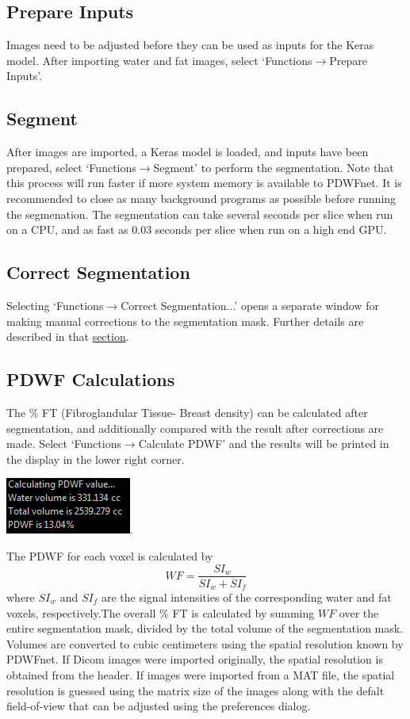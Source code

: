 \documentclass[twoside,a4paper]{refart}
\newcommand{\ra}{$\rightarrow$}
\begin{document}
\subsection{Prepare Inputs}

Images need to be adjusted before they can be used as inputs for the Keras model. After importing water and fat images, select `Functions\ra Prepare Inputs'.

\subsection{Segment}

After images are imported, a Keras model is loaded, and inputs have been prepared, select `Functions\ra Segment' to perform the segmentation. Note that this process will run faster if more system memory is available to PDWFnet. It is recommended to close as many background programs as possible before running the segmenation.
The segmentation can take several seconds per slice when run on a CPU, and as fast as 0.03 seconds per slice when run on a high end GPU.

\subsection{Correct Segmentation}

Selecting `Functions\ra Correct Segmentation...' opens a separate window for making manual corrections to the segmentation mask. Further details are described in that \hyperref[Corrections]{section}.

\subsection{PDWF Calculations}
The \% FT (Fibroglandular Tissue- Breast density) can be calculated after segmentation, and additionally compared with the result after corrections are made. Select `Functions\ra Calculate PDWF' and the results will be printed in the display in the lower right corner.

\includegraphics[width=.3\textwidth]{PDWFtable}.

The PDWF for each voxel is calculated by 
\begin{equation}
	WF = \frac{SI_w}{SI_w + SI_f}
\end{equation}
where $SI_w$ and $SI_f$ are the signal intensities of the corresponding water and fat voxels, respectively.The overall \% FT is calculated by summing $WF$ over the entire segmentation mask, divided by the total volume of the segmentation mask. Volumes are converted to cubic centimeters using the spatial resolution known by PDWFnet. If Dicom images were imported originally, the spatial resolution is obtained from the header. If images were imported from a MAT file, the spatial resolution is guessed using the matrix size of the images along with the defalt field-of-view that can be adjusted using the preferences dialog.
\end{document}
